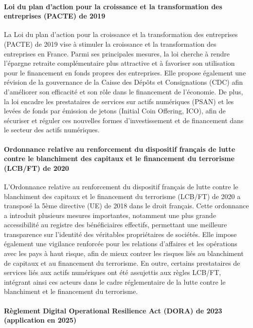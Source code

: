 \documentclass[a4paper, 12pt]{report}
\begin{document}
\paragraph{Loi du plan d'action pour la croissance et la transformation des entreprises (PACTE) de 2019}

La Loi du plan d'action pour la croissance et la transformation des entreprises (PACTE) de 2019 vise à stimuler la croissance et la transformation des entreprises en France. Parmi ses principales mesures, la loi cherche à rendre l'épargne retraite complémentaire plus attractive et à favoriser son utilisation pour le financement en fonds propres des entreprises. Elle propose également une révision de la gouvernance de la Caisse des Dépôts et Consignations (CDC) afin d'améliorer son efficacité et son rôle dans le financement de l'économie. De plus, la loi encadre les prestataires de services sur actifs numériques (PSAN) et les levées de fonds par émission de jetons (Initial Coin Offering, ICO), afin de sécuriser et réguler ces nouvelles formes d'investissement et de financement dans le secteur des actifs numériques.

\paragraph{Ordonnance relative au renforcement du dispositif français de lutte contre le blanchiment des capitaux et le financement du terrorisme (LCB/FT) de 2020}

L'Ordonnance relative au renforcement du dispositif français de lutte contre le blanchiment des capitaux et le financement du terrorisme (LCB/FT) de 2020 a transposé la 5ème directive (UE) de 2018 dans le droit français. Cette ordonnance a introduit plusieurs mesures importantes, notamment une plus grande accessibilité au registre des bénéficiaires effectifs, permettant une meilleure transparence sur l'identité des véritables propriétaires de sociétés. Elle impose également une vigilance renforcée pour les relations d’affaires et les opérations avec les pays à haut risque, afin de mieux contrer les risques liés au blanchiment de capitaux et au financement du terrorisme. En outre, certains prestataires de services liés aux actifs numériques ont été assujettis aux règles LCB/FT, intégrant ainsi ces acteurs dans le cadre réglementaire de la lutte contre le blanchiment et le financement du terrorisme.

\paragraph{Règlement Digital Operational Resilience Act (DORA) de 2023 (application en 2025)}
\end{document}
